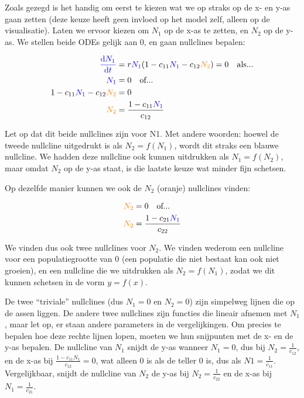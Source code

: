 \documentclass[
  a4paper,
]{scrbook}
\theoremstyle{definition}
\theoremstyle{remark}
\begin{document}
Zoals gezegd is het handig om eerst te kiezen wat we op straks op de x-
en y-as gaan zetten (deze keuze heeft geen invloed op het model zelf,
alleen op de visualisatie). Laten we ervoor kiezen om \(N_1\) op de x-as
te zetten, en \(N_2\) op de y-as. We stellen beide ODEs gelijk aan 0, en
gaan nullclines bepalen:

\begin{align*}
\color{blue} \mathchoice{\frac{\mathrm{d}N_1}
{\mathrm{d}t}}{\mathrm{d}N_1/\mathrm{d}t}
{\mathrm{d}N_1/\mathrm{d}t}
{\mathrm{d}N_1/\mathrm{d}t} &= r\textcolor{blue}{N_1}(1 - c_{11}\textcolor{blue}{N_1} - c_{12}\textcolor{orange}{N_2}) = 0  \quad \text{als...} \\
\textcolor{blue}{N_1} &= 0 \quad \text{of...} \\
1 - c_{11}\textcolor{blue}{N_1} - c_{12}\textcolor{orange}{N_2} &= 0 \\
 \textcolor{orange}{N_2} &= \frac{1 - c_{11}\textcolor{blue}{N_1}}{c_{12}}
\end{align*}

Let op dat dit beide nullclines zijn voor {N1}. Met andere woorden:
hoewel de tweede nullcline uitgedrukt is als \(N_2=f(N_1)\), wordt dit
straks een {blauwe} nullcline. We hadden deze nullcline ook kunnen
uitdrukken als \(N_1=f(N_2)\), maar omdat \(N_2\) op de y-as staat, is
die laatste keuze wat minder fijn schetsen.

Op dezelfde manier kunnen we ook de \(N_2\) ({oranje}) nullclines
vinden:

\begin{align*}
\textcolor{orange}{N_2} &= 0 \quad \text{of...} \\
\textcolor{orange}{N_2} &= \frac{1 - c_{21}\textcolor{blue}{N_1}}{c_{22}}
\end{align*}

We vinden dus ook twee nullclines voor \(N_2\). We vinden wederom een
nullcline voor een populatiegrootte van 0 (een populatie die niet
bestaat kan ook niet groeien), en een nullcline die we uitdrukken als
\(N_2=f(N_1)\), zodat we dit kunnen schetsen in de vorm \(y=f(x)\).

De twee ``triviale'' nullclines (dus \(N_1=0\) en \(N_2=0\)) zijn
simpelweg lijnen die op de assen liggen. De andere twee nullclines zijn
functies die lineair afnemen met \(N_1\), maar let op, er staan andere
parameters in de vergelijkingen. Om precies te bepalen hoe deze rechte
lijnen lopen, moeten we hun snijpunten met de x- en de y-as bepalen. {De
nullcline van \(N_1\)} snijdt de y-as wanneer \(N_1=0\), dus bij
\(N_2=\frac{1}{c_{12}}\), en de x-as bij
\(\frac{1 - c_{11}N_1}{c_{12}}=0\), wat alleen 0 is als de teller 0 is,
dus als \(N1=\frac{1}{c_{11}}\). Vergelijkbaar, snijdt {de nullcline van
\(N_2\)} de y-as bij \(N_2=\frac{1}{c_{22}}\) en de x-as bij
\(N_1=\frac{1}{c_{21}}\).
\end{document}
